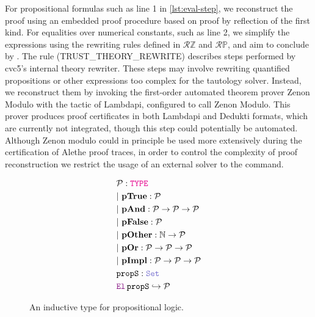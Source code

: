 For propositional formulas such as line 1 in \cref{lst:eval-step}, we reconstruct the proof using an embedded proof procedure based on proof by reflection of the first kind.
For equalities over numerical constants, such as line 2, we simplify the expressions using the rewriting rules defined in $\mathcal{R}{\mathbb{Z}}$ and $\mathcal{R}{\mathbb{P}}$, and aim to conclude by .
The rule  (TRUST\_THEORY\_REWRITE) describes steps performed by cvc5’s internal theory rewriter.
These steps may involve rewriting quantified propositions or other expressions too complex for the tautology solver.
Instead, we reconstruct them by invoking the first-order automated theorem prover Zenon Modulo \cite{zenonmodulo} with the tactic  of Lambdapi, configured to call Zenon Modulo.
This prover produces proof certificates in both Lambdapi and Dedukti formats, which are currently not integrated,  though this step could potentially be automated.
Although Zenon modulo could in principle be used more extensively during the certification of Alethe proof traces, in order to control the complexity of proof reconstruction we restrict the usage of an external solver to the  command.

\begin{figure}
\begin{align*}
& \cal{P} : \type \\
& |~\textbf{pTrue} : \cal{P} \\
& |~\textbf{pAnd} : \cal{P} \ra \cal{P} \ra \cal{P} \\
& |~\textbf{pFalse} : \cal{P} \\
& |~\textbf{pOther} : \N \ra \cal{P} \\
& |~\textbf{pOr} : \cal{P} \ra \cal{P} \ra \cal{P} \\
& |~\textbf{pImpl} : \cal{P} \ra \cal{P} \ra \cal{P} \\
& \kw{propS}: \set \\
& \el\,\kw{propS} \re \cal{P}
\end{align*}
\caption{An inductive type for propositional logic.}
\label{fig:prop}
\end{figure}

